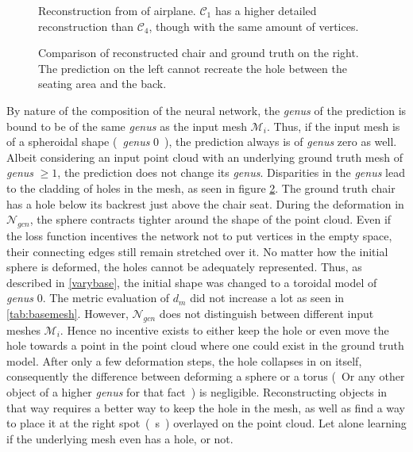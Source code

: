   \begin{figure}[htbp]
    \centering
    \caption{Reconstruction from of airplane. $\mathcal{C}_1$ has a higher detailed reconstruction than $\mathcal{C}_4$, though with the same amount of vertices.} \label{fig:simpleairplanes}
  \end{figure}
  \begin{figure}[htbp]
    \centering
    \caption{Comparison of reconstructed chair and ground truth on the right. The prediction on the left cannot recreate the hole between the seating area and the back.} \label{fig:chairsclad}
  \end{figure}
  By nature of the composition of the neural network, the \emph{genus} of the prediction is bound to be of the same \emph{genus} as the input mesh 
  $\mathcal{M}_i$. Thus, if the input mesh is of a spheroidal shape (~\emph{genus} 0~), the prediction always is of \emph{genus} zero as well.
  Albeit considering an input point cloud with an underlying ground truth mesh of \emph{genus} $\geq 1$, the prediction does not change its \emph{genus}.
  Disparities in the \emph{genus} lead to the cladding of holes in the mesh, as seen in figure \ref{fig:chairsclad}. The ground truth chair has a hole
  below its backrest just above the chair seat. During the deformation in $\mathcal{N}_{gcn}$, the sphere contracts tighter around the shape of the point
  cloud. Even if the loss function incentives the network not to put vertices in the empty space, their connecting edges still remain stretched over it.
  No matter how the initial sphere is deformed, the holes cannot be adequately represented. 
  Thus, as described in \ref{varybase}, the initial shape was changed to a toroidal model of \emph{genus} 0. The metric evaluation of $d_m$ did not increase 
  a lot as seen in \ref{tab:basemesh}. However, $\mathcal{N}_{gcn}$ does not distinguish between different input meshes $\mathcal{M}_i$. Hence no incentive
  exists to either keep the hole or even move the hole towards a point in the point cloud where one could exist in the ground truth model. After only a few 
  deformation steps, the hole collapses in on itself, consequently the difference between deforming a sphere or a torus (~Or any other object of a higher
  \emph{genus} for that fact~) is negligible. 
  Reconstructing objects in that way requires a better way to keep the hole in the mesh, as well as find a way to place it at the right spot~(~s~) overlayed 
  on the point cloud. Let alone learning if the underlying mesh even has a hole, or not.

